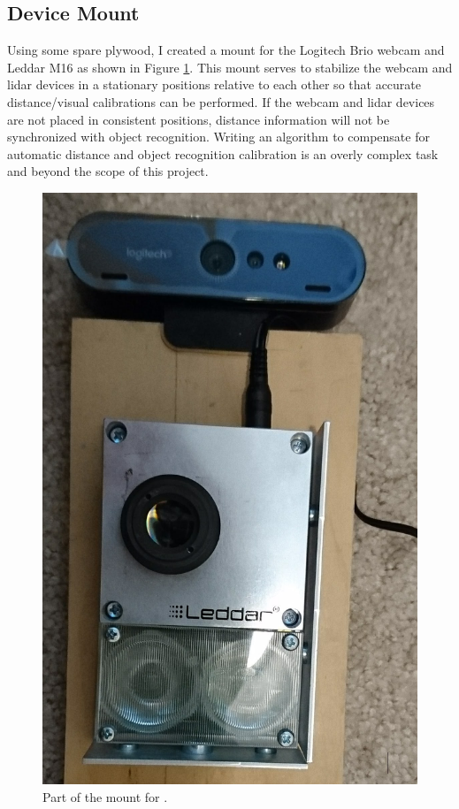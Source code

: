 \documentclass[onecolumn, draftclsnofoot,10pt, compsoc]{IEEEtran}
\makeatletter
\newcommand\captionof[1]{\def\@captype{#1}\caption}
\makeatother
\begin{document}
\begin{singlespace}
	\section{Device Mount}
		Using some spare plywood, I created a mount for the Logitech Brio webcam and Leddar M16 as shown in Figure \ref{mount1}.
		This mount serves to stabilize the webcam and lidar devices in a stationary positions relative to each other so that accurate distance/visual calibrations can be performed.
		If the webcam and lidar devices are not placed in consistent positions, distance information will not be synchronized with object recognition.
		Writing an algorithm to compensate for automatic distance and object recognition calibration is an overly complex task and beyond the scope of this project.

		\begin{figure}[H]
			\includegraphics[scale=0.2]{mount1.PNG}
			\captionof{figure}{Part of the mount for .}
			\label{mount1}
		\end{figure}



\end{singlespace}
\end{document}
